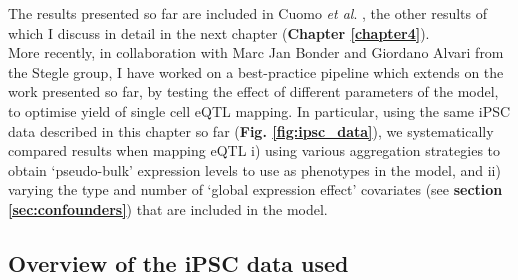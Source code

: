 The results presented so far are included in Cuomo \textit{et al}. \cite{cuomo2020single}, the other results of which I discuss in detail in the next chapter (\textbf{Chapter 
\ref{chapter4}}). \\

More recently, in collaboration with Marc Jan Bonder and Giordano Alvari from the Stegle group, I have worked on a best-practice pipeline which extends on the work presented so far, by testing the effect of different parameters of the model, to optimise yield of single cell eQTL mapping.
In particular, using the same iPSC data described in this chapter so far (\textbf{Fig. \ref{fig:ipsc_data}}), we systematically compared results when mapping eQTL i) using various aggregation strategies to obtain `pseudo-bulk' expression levels to use as phenotypes in the model, and ii) varying the type and number of `global expression effect' covariates (see \textbf{section
\ref{sec:confounders}})
that are included in the model.

\subsection{Overview of the iPSC data used}

